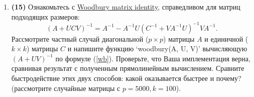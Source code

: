 \documentclass[prb,papersize=a4paper,notitlepage]{revtex4-1}%
\begin{document}
\begin{enumerate}
\item \textbf{(15)} Ознакомьтесь с \href{https://en.wikipedia.org/wiki/Woodbury_matrix_identity}{Woodbury matrix identity}, справедливом для матриц подходящих размеров:
\begin{equation}
\label{wb}
\left(A+UCV\right)^{-1}=A^{-1}-A^{-1}U\left(C^{-1}+VA^{-1}U\right)^{-1}VA^{-1}.
\end{equation}
Рассмотрите частный случай диагональной ($p\times p$) матрицы $A$ и единичной ($k\times k$) матрицы $C$ и напишите функцию `woodbury(A, U, V)' вычисляющую $\left(A+UV\right)^{-1}$ по формуле (\ref{wb}). Проверьте, что Ваша имплементация верна, сравнивая результат с полученным прямолинейным вычислением.
Сравните быстродействие этих двух способов: какой оказывается быстрее и почему? (рассмотрите случайные матрицы с $p = 5000, k = 100$).




\end{enumerate}
\end{document}
